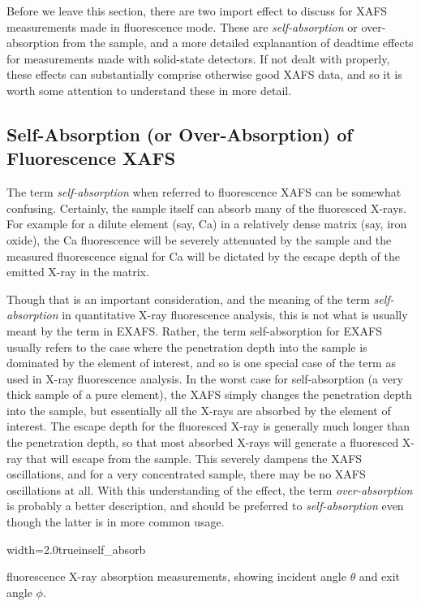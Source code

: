 Before we leave this section, there are two import effect to discuss for
XAFS measurements made in fluorescence mode.  These are
\emph{self-absorption} or over-absorption from the sample, and a more
detailed explanantion of deadtime effects for measurements made with
solid-state detectors.  If not dealt with properly, these effects can
substantially comprise otherwise good XAFS data, and so it is worth some
attention to understand these in more detail.

\subsection{Self-Absorption (or Over-Absorption) of Fluorescence XAFS}

The term \emph{self-absorption} when referred to fluorescence XAFS can be
somewhat confusing.  Certainly, the sample itself can absorb many of the
fluoresced X-rays.  For example for a dilute element (say, Ca) in a
relatively dense matrix (say, iron oxide), the Ca fluorescence will be
severely attenuated by the sample and the measured fluorescence signal for
Ca will be dictated by the escape depth of the emitted X-ray in the matrix.

Though that is an important consideration, and the meaning of the term
{\emph{self-absorption}} in quantitative X-ray fluorescence analysis, this
is not what is usually meant by the term in EXAFS.  Rather, the term
self-absorption for EXAFS usually refers to the case where the penetration
depth into the sample is dominated by the element of interest, and so is
one special case of the term as used in X-ray fluorescence analysis.  In
the worst case for self-absorption (a very thick sample of a pure element),
the XAFS simply changes the penetration depth into the sample, but
essentially all the X-rays are absorbed by the element of interest.  The
escape depth for the fluoresced X-ray is generally much longer than the
penetration depth, so that most absorbed X-rays will generate a fluoresced
X-ray that will escape from the sample.  This severely dampens the XAFS
oscillations, and for a very concentrated sample, there may be no XAFS
oscillations at all.  With this understanding of the effect, the term
{\emph{over-absorption}}\cite{ManceauRIMG2002} is probably a better
description, and should be preferred to {\emph{self-absorption}} even
though the latter is in more common usage.

\begin{Nfig}{width=2.0truein}{self_absorb}
  \caption{fluorescence X-ray absorption measurements, showing incident
    angle $\theta$ and exit angle $\phi$. }
  \label{Fig:MEAS:expt1}
\end{Nfig}


